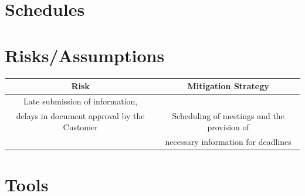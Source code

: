 \documentclass{article}
\begin{document}
\section{Schedules}

\newpage

\section{Risks/Assumptions}
\begin{table}[h!]
\centering
 \begin{tabular}{||c{1cm} c||} 
 \hline
 Risk & Mitigation Strategy \\ [0.5ex] 
 \hline
 \hline
 Late submission of information,\\ delays in document approval by the Customer & Scheduling of meetings and the provision of \\ & necessary information for deadlines\\ [1ex] 
 \hline
 \end{tabular}
\end{table}
\newpage

\section{Tools}

\newpage
\end{document}
